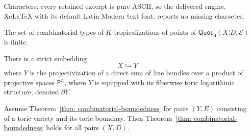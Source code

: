 \documentclass[10pt,a4paper]{amsart}
\begin{document}
Characters: every retained excerpt is pure ASCII, so the delivered engine, XeLaTeX with its default Latin Modern text font, reports no missing character.
\begin{theorem}\label{thm: combinatorial-boundedness}
The set of combinatorial types of $K$-tropicalizations of points of $\mathsf{Quot}_\Lambda(X|D,\mathcal E)$ is finite. 
\end{theorem}

\begin{proposition}\label{prop: global-toric-embedding}
There is a strict embedding
\[
X\hookrightarrow Y
\]
where $Y$ is the projectivization of a direct sum of line bundles over a product of projective spaces $\mathbb P^{\underline n}$, where $Y$ is equipped with its fiberwise toric logarithmic structure, denoted $\partial Y$.
\end{proposition}

\begin{proposition}\label{prop:Toric Case Enough}
Assume Theorem~\ref{thm: combinatorial-boundedness} for pairs $(Y,E)$ consisting of a toric variety and its toric boundary. Then Theorem~\ref{thm: combinatorial-boundedness} holds for all pairs $(X,D)$. 
\end{proposition}
\end{document}
